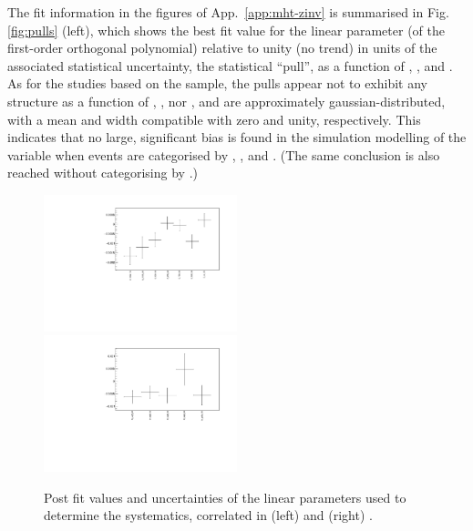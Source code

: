 The fit information in the figures of App.~\ref{app:mht-zinv} is
summarised in Fig.\ref{fig:pulls} (left), which shows the best fit
value for the linear parameter (of the first-order orthogonal
polynomial) relative to unity (\ie no trend) in units of the
associated statistical uncertainty, \ie the statistical ``pull'', as a
function of \njet, \nb, and \scalht. As for the studies based on the
\mmj sample, the pulls appear not to exhibit any structure as a
function of \njet, \nb, nor \scalht, and are approximately
gaussian-distributed, with a mean and width compatible with zero and
unity, respectively. This indicates that no large, significant bias is
found in the simulation modelling of the \mht variable when events are
categorised by \njet, \scalht, and \nb. (The same conclusion is also
reached without categorising by \nb.)
\begin{figure}[h!]
  \centering
  \includegraphics[width=0.5\textwidth]{figures/mhtTemplate/exclusive_corr_njet/MuMu_graph}~
  \includegraphics[width=0.5\textwidth]{figures/mhtTemplate/exclusive_corr_ht/MuMu_graph}\\
  \caption{\label{fig:postFitMuMu} Post fit values and uncertainties of
    the linear parameters used to determine the systematics,
    correlated in (left) \njet and (right) \scalht.}
\end{figure}


